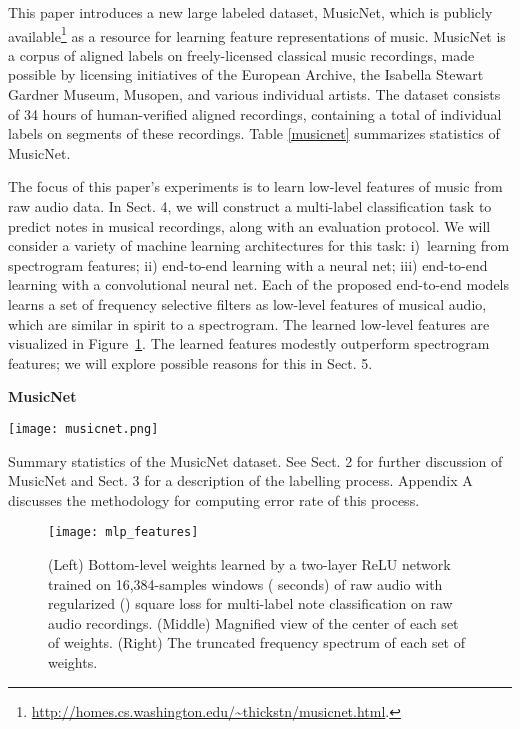 \documentclass{article} \usepackage{iclr2017_conference,times}
\begin{document}
This paper introduces a new large labeled dataset, MusicNet, which is publicly available\footnote{\url{http://homes.cs.washington.edu/~thickstn/musicnet.html}.} as a resource for learning feature representations of music. MusicNet is a corpus of aligned labels on freely-licensed classical music recordings, made possible by licensing initiatives of the European Archive, the Isabella Stewart Gardner Museum, Musopen, and various individual artists. The dataset consists of 34 hours of human-verified aligned recordings, containing a total of  individual labels on segments of these recordings. Table \ref{musicnet} summarizes statistics of MusicNet. 

The focus of this paper's experiments is to learn low-level features of music from raw audio data. In Sect. 4, we will construct a multi-label classification task to predict notes in musical recordings, along with an evaluation protocol. We will consider a variety of machine learning architectures for this task: i)~learning from spectrogram features;  ii) end-to-end learning with a neural net;  iii) end-to-end learning with a convolutional neural net. Each of the proposed end-to-end models learns a set of frequency selective filters as low-level features of musical audio, which are similar in spirit to a spectrogram. The learned low-level features are visualized in Figure~\ref{mlp_features}. The learned features modestly outperform spectrogram features; we will explore possible reasons for this in Sect. 5.




\begin{table}[t]
  \centering
  \textbf{\large MusicNet}\par\medskip
  \texttt{[image: musicnet.png]}
  \caption{Summary statistics of the MusicNet dataset. See Sect. 2 for further discussion of MusicNet and Sect. 3 for a description of the labelling process. Appendix A discusses the methodology for computing error rate of this process.}
  \label{musicnet}
\end{table}

\begin{figure}[b]
  \centering
  \texttt{[image: mlp\_features]}
  \caption{(Left) Bottom-level weights learned by a two-layer ReLU network trained on 16,384-samples windows ( seconds) of raw audio with  regularized () square loss for multi-label note classification on raw audio recordings. (Middle) Magnified view of the center of each set of weights. (Right) The truncated frequency spectrum of each set of weights.}
  \label{mlp_features}
\end{figure}
\end{document}
